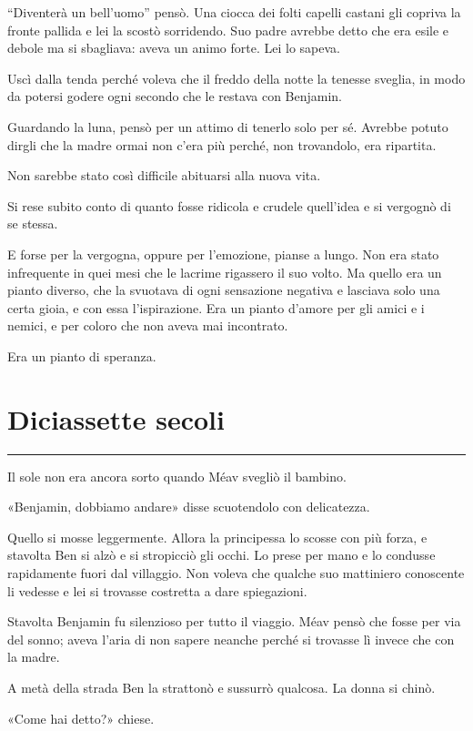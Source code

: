 \documentclass[a4paper,11pt,oneside,openright,final]{memoir}
\begin{document}
``Diventerà un bell'uomo'' pensò. Una ciocca dei folti capelli castani gli
copriva la fronte pallida e lei la scostò sorridendo. Suo padre avrebbe detto
che era esile e debole ma si sbagliava: aveva un animo forte. Lei lo sapeva.

Uscì dalla tenda perché voleva che il freddo della notte la tenesse sveglia,
in modo da potersi godere ogni secondo che le restava con Benjamin.

Guardando la luna, pensò per un attimo di tenerlo solo per sé. Avrebbe potuto
dirgli che la madre ormai non c'era più perché, non trovandolo, era ripartita.

Non sarebbe stato così difficile abituarsi alla nuova vita.

Si rese subito conto di quanto fosse ridicola e crudele quell'idea e si
vergognò di se stessa.

E forse per la vergogna, oppure per l'emozione, pianse a lungo. Non era stato
infrequente in quei mesi che le lacrime rigassero il suo volto. Ma quello era un
pianto diverso, che la svuotava di ogni sensazione negativa e lasciava solo una
certa gioia, e con essa l'ispirazione. Era un pianto d'amore per gli amici e i
nemici, e per coloro che non aveva mai incontrato.

Era un pianto di speranza.

\chapter{Diciassette secoli}

\plainbreak{1}

Il sole non era ancora sorto quando Méav svegliò il bambino.

«Benjamin, dobbiamo andare» disse scuotendolo con delicatezza.

Quello si mosse leggermente. Allora la principessa lo scosse con più forza, e
stavolta Ben si alzò e si stropicciò gli occhi. Lo prese per mano e lo
condusse rapidamente fuori dal villaggio. Non voleva che qualche suo mattiniero
conoscente li vedesse e lei si trovasse costretta a dare spiegazioni.

Stavolta Benjamin fu silenzioso per tutto il viaggio. Méav pensò che fosse per
via del sonno; aveva l'aria di non sapere neanche perché si trovasse lì invece
che con la madre.

A metà della strada Ben la strattonò e sussurrò qualcosa. La donna si chinò.

«Come hai detto?» chiese.
\end{document}
